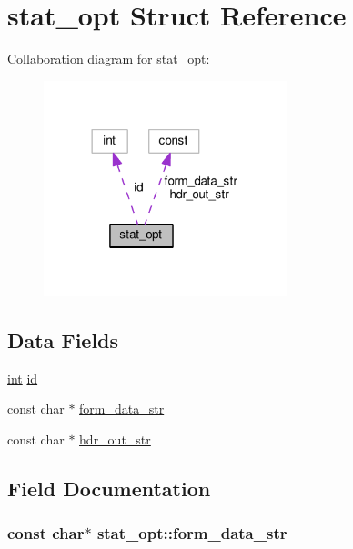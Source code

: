 \hypertarget{structstat__opt}{}\section{stat\+\_\+opt Struct Reference}
\label{structstat__opt}


Collaboration diagram for stat\+\_\+opt\+:
\nopagebreak
\begin{figure}[H]
\begin{center}
\leavevmode
\includegraphics[width=201pt]{structstat__opt__coll__graph}
\end{center}
\end{figure}
\subsection*{Data Fields}
\begin{DoxyCompactItemize}
\item 
\hyperlink{pcre_8txt_a42dfa4ff673c82d8efe7144098fbc198}{int} \hyperlink{structstat__opt_a9d3de19e629c152a1dc989330b9f2d5d}{id}
\item 
const char $\ast$ \hyperlink{structstat__opt_a17b81a779e8042c253f77c70c86ce8cd}{form\+\_\+data\+\_\+str}
\item 
const char $\ast$ \hyperlink{structstat__opt_abf474c351c6d2df11ad04f9757894988}{hdr\+\_\+out\+\_\+str}
\end{DoxyCompactItemize}


\subsection{Field Documentation}
\subsubsection[{\texorpdfstring{form\+\_\+data\+\_\+str}{form_data_str}}]{\setlength{\rightskip}{0pt plus 5cm}const char$\ast$ stat\+\_\+opt\+::form\+\_\+data\+\_\+str}\hypertarget{structstat__opt_a17b81a779e8042c253f77c70c86ce8cd}{}\label{structstat__opt_a17b81a779e8042c253f77c70c86ce8cd}
